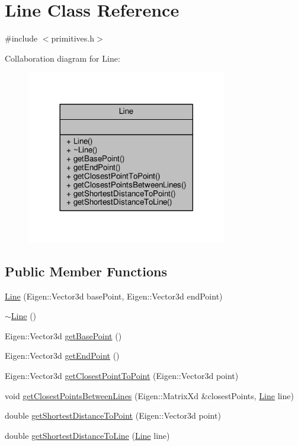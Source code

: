 \hypertarget{class_line}{}\section{Line Class Reference}
\label{class_line}


{\ttfamily \#include $<$primitives.\+h$>$}



Collaboration diagram for Line\+:
\nopagebreak
\begin{figure}[H]
\begin{center}
\leavevmode
\includegraphics[width=248pt]{class_line__coll__graph}
\end{center}
\end{figure}
\subsection*{Public Member Functions}
\begin{DoxyCompactItemize}
\item 
\hyperlink{class_line_acb2738366446296860a14644c11a93cd}{Line} (Eigen\+::\+Vector3d base\+Point, Eigen\+::\+Vector3d end\+Point)
\item 
\hyperlink{class_line_aabe85f48d22d92b62257091f48174fac}{$\sim$\+Line} ()
\item 
Eigen\+::\+Vector3d \hyperlink{class_line_a649b65b3ddb9702ad3800a76ad8ca274}{get\+Base\+Point} ()
\item 
Eigen\+::\+Vector3d \hyperlink{class_line_a227b3d61216a37b32b856a56be6761a7}{get\+End\+Point} ()
\item 
Eigen\+::\+Vector3d \hyperlink{class_line_a920e0d93c96f3fcf85acb301d920063e}{get\+Closest\+Point\+To\+Point} (Eigen\+::\+Vector3d point)
\item 
void \hyperlink{class_line_a61228b3629e0f8b204c60a6d337bb546}{get\+Closest\+Points\+Between\+Lines} (Eigen\+::\+Matrix\+Xd \&closest\+Points, \hyperlink{class_line}{Line} line)
\item 
double \hyperlink{class_line_af874e592b4b8a7db37b0a6d8feb5cf3f}{get\+Shortest\+Distance\+To\+Point} (Eigen\+::\+Vector3d point)
\item 
double \hyperlink{class_line_a4097eed5d653a46fe18b760c67a53a37}{get\+Shortest\+Distance\+To\+Line} (\hyperlink{class_line}{Line} line)
\end{DoxyCompactItemize}


